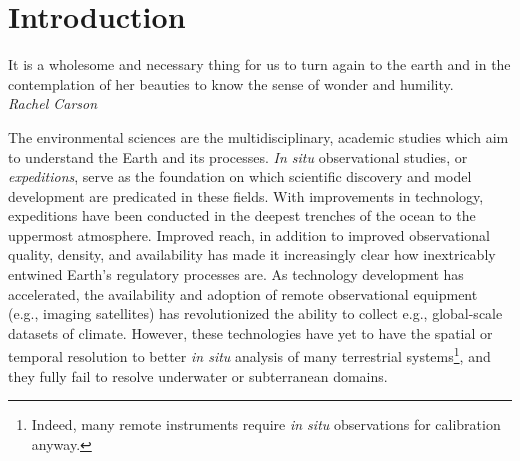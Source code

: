 \chapter{Introduction}
\label{chap:intro}

\begin{center}
    \begin{minipage}{0.7\textwidth}
      \begin{small}
       It is a wholesome and necessary thing for us to turn again to the earth and in the contemplation of her beauties to know the sense of wonder and humility.\\ \emph{Rachel Carson}
      \end{small}
    \end{minipage}
    \vspace{0.5cm}
\end{center}



The environmental sciences are the multidisciplinary, academic studies which aim to understand the Earth and its processes.
\emph{In situ} observational studies, or \emph{expeditions}, serve as the foundation on which scientific discovery and model development are predicated in these fields.
With improvements in technology, expeditions have been conducted in the deepest trenches of the ocean to the uppermost atmosphere.
Improved reach, in addition to improved observational quality, density, and availability has made it increasingly clear how inextricably entwined Earth's regulatory processes are.
As technology development has accelerated, the availability and adoption of remote observational equipment (e.g., imaging satellites) has revolutionized the ability to collect e.g., global-scale datasets of climate.
However, these technologies have yet to have the spatial or temporal resolution to better \emph{in situ} analysis of many terrestrial systems\footnote{Indeed, many remote instruments require \emph{in situ} observations for calibration anyway.}, and they fully fail to resolve underwater or subterranean domains. 

